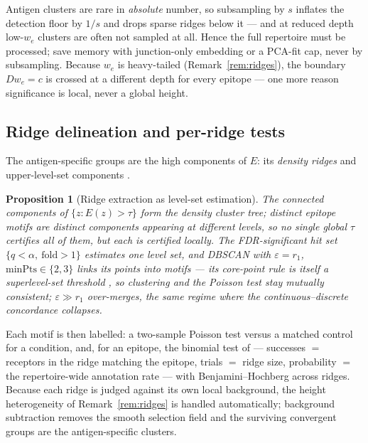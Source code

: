 \documentclass[11pt]{article}
\theoremstyle{oldplain}
\newtheorem{proposition}{Proposition}
\theoremstyle{oldrem}
\begin{document}
Antigen clusters are rare in \emph{absolute} number, so subsampling by $s$ inflates the detection floor by
$1/s$ and drops sparse ridges below it --- and at reduced depth low-$w_e$ clusters are often not sampled at
all. Hence the full repertoire must be processed; save memory with junction-only embedding or a {\scshape
PCA}-fit cap, never by subsampling. Because $w_e$ is heavy-tailed (Remark~\ref{rem:ridges}), the boundary
$Dw_e=c$ is crossed at a different depth for every epitope --- one more reason significance is local, never a
global height.

\subsection{Ridge delineation and per-ridge tests}\label{sec:dens-ridge}

The antigen-specific groups are the high components of $E$: its \emph{density ridges}
\cite{Genovese2014} and upper-level-set components \cite{ChaudhuriDasgupta2010,Rinaldo2010}.

\begin{proposition}[Ridge extraction as level-set estimation]\label{prop:ridge}
The connected components of $\{z:E(z)>\tau\}$ form the density cluster tree; distinct epitope motifs are
distinct components appearing at different levels, so no single global $\tau$ certifies all of them, but each
is certified locally. The {\scshape FDR}-significant hit set $\{q<\alpha,\ \mathrm{fold}>1\}$ estimates one
level set, and {\scshape DBSCAN} with $\varepsilon=r_1$, $\mathrm{minPts}\in\{2,3\}$ links its points into
motifs --- its core-point rule is itself a superlevel-set threshold \cite{Ester1996,Rinaldo2010}, so
clustering and the Poisson test stay mutually consistent; $\varepsilon\gg r_1$ over-merges, the same regime
where the continuous--discrete concordance collapses.
\end{proposition}

Each motif is then labelled: a two-sample Poisson test versus a matched control for a condition, and, for an
epitope, the binomial test of \cite{PogorelyyShugay2019} --- successes $=$ receptors in the ridge matching the
epitope, trials $=$ ridge size, probability $=$ the repertoire-wide annotation rate --- with
Benjamini--Hochberg across ridges. Because each ridge is judged against its own local background, the height
heterogeneity of Remark~\ref{rem:ridges} is handled automatically; background subtraction removes the smooth
selection field and the surviving convergent groups are the antigen-specific clusters.
\end{document}
